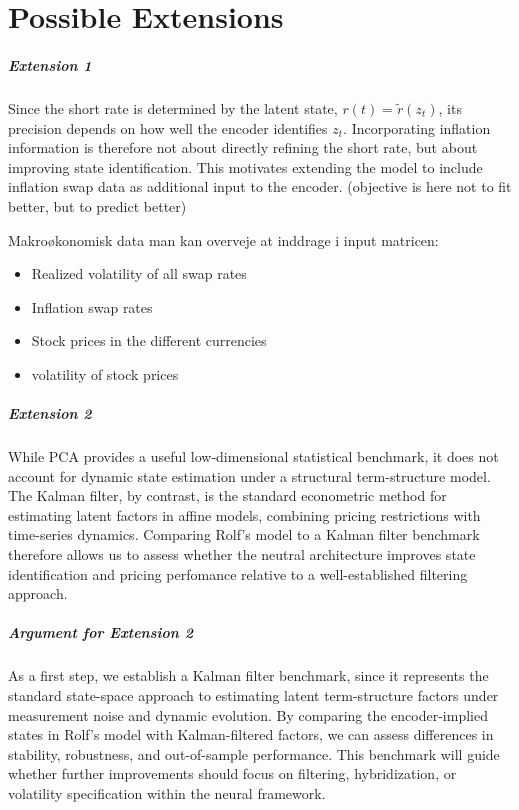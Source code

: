 \chapter{Possible Extensions}
\label{chap:disc}



\paragraph{Extension 1} Since the short rate is determined by the latent state, $r(t)=\tilde{r}(z_t)$, its precision depends on how well the encoder identifies $z_t$. Incorporating inflation information is therefore not about directly refining the short rate, but about improving state identification. This motivates extending the model to include inflation swap data as additional input to the encoder. (objective is here not to fit better, but to predict better)

Makroøkonomisk data man kan overveje at inddrage i input matricen:
\begin{itemize}
    \item Realized volatility of all swap rates
    \item Inflation swap rates
    \item Stock prices in the different currencies
    \item volatility of stock prices
\end{itemize}




\paragraph{Extension 2} While PCA provides a useful low-dimensional statistical benchmark, it does not account for dynamic state estimation under a structural term-structure model. 
The Kalman filter, by contrast, is the standard econometric method for estimating latent factors in affine models, combining pricing restrictions with time-series dynamics. Comparing Rolf's model to a Kalman filter benchmark therefore allows us to assess whether the neutral architecture improves state identification and pricing perfomance relative to a well-established filtering approach.



\paragraph{Argument for Extension 2} As a first step, we establish a Kalman filter benchmark, since it represents the standard state-space approach to estimating latent term-structure factors under measurement noise and dynamic evolution. By comparing the encoder-implied states in Rolf’s model with Kalman-filtered factors, we can assess differences in stability, robustness, and out-of-sample performance. This benchmark will guide whether further improvements should focus on filtering, hybridization, or volatility specification within the neural framework.









